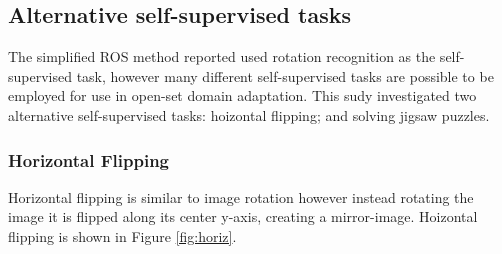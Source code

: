 \documentclass[10pt,twocolumn,letterpaper]{article}
\begin{document}
\subsection{Alternative self-supervised tasks}

The simplified ROS method reported used rotation recognition as the self-supervised task, however many different self-supervised tasks are possible to be employed for use in open-set domain adaptation. This sudy investigated two alternative self-supervised tasks: hoizontal flipping; and solving jigsaw puzzles.

\subsubsection*{Horizontal Flipping}

Horizontal flipping is similar to image rotation however instead rotating the image it is flipped along its center y-axis, creating a mirror-image. Hoizontal flipping is shown in Figure \ref{fig:horiz}.
\end{document}
